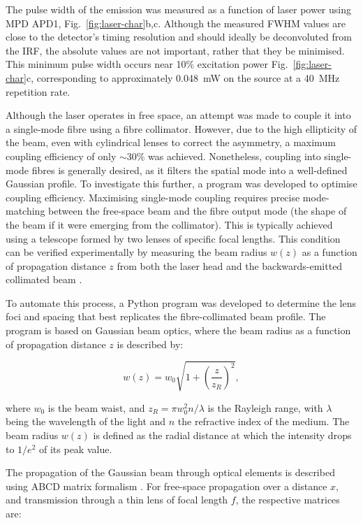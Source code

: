 The pulse width of the emission was measured as a function of laser power using MPD APD1, Fig.~\ref{fig:laser-char}b,c. Although the measured FWHM values are close to the detector’s timing resolution and should ideally be deconvoluted from the IRF, the absolute values are not important, rather that they be minimised. This minimum pulse width occurs near 10\% excitation power Fig.~\ref{fig:laser-char}c, corresponding to approximately 0.048~mW on the source at a 40~MHz repetition rate.

Although the laser operates in free space, an attempt was made to couple it into a single-mode fibre using a fibre collimator. However, due to the high ellipticity of the beam, even with cylindrical lenses to correct the asymmetry, a maximum coupling efficiency of only $\sim$30\% was achieved. Nonetheless, coupling into single-mode fibres is generally desired, as it filters the spatial mode into a well-defined Gaussian profile. To investigate this further, a program was developed to optimise coupling efficiency. Maximising single-mode coupling requires precise mode-matching between the free-space beam and the fibre output mode (the shape of the beam if it were emerging from the collimator). This is typically achieved using a telescope formed by two lenses of specific focal lengths. This condition can be verified experimentally by measuring the beam radius $w(z)$ as a function of propagation distance $z$ from both the laser head and the backwards-emitted collimated beam \cite{BahaaE.A.Saleh1991}.

To automate this process, a Python program was developed to determine the lens foci and spacing that best replicates the fibre-collimated beam profile. The program is based on Gaussian beam optics, where the beam radius as a function of propagation distance $z$ is described by:

\begin{equation}
    w(z) = w_0 \sqrt{1 + \left( \frac{z}{z_R} \right)^2},
    \label{eqn:beam-radius}
\end{equation}

where $w_0$ is the beam waist, and $z_R = \pi w_0^2 n / \lambda$ is the Rayleigh range, with $\lambda$ being the wavelength of the light and $n$ the refractive index of the medium. The beam radius $w(z)$ is defined as the radial distance at which the intensity drops to $1/e^2$ of its peak value.

The propagation of the Gaussian beam through optical elements is described using ABCD matrix formalism \cite{Popescu2022}. For free-space propagation over a distance $x$, and transmission through a thin lens of focal length $f$, the respective matrices are:

